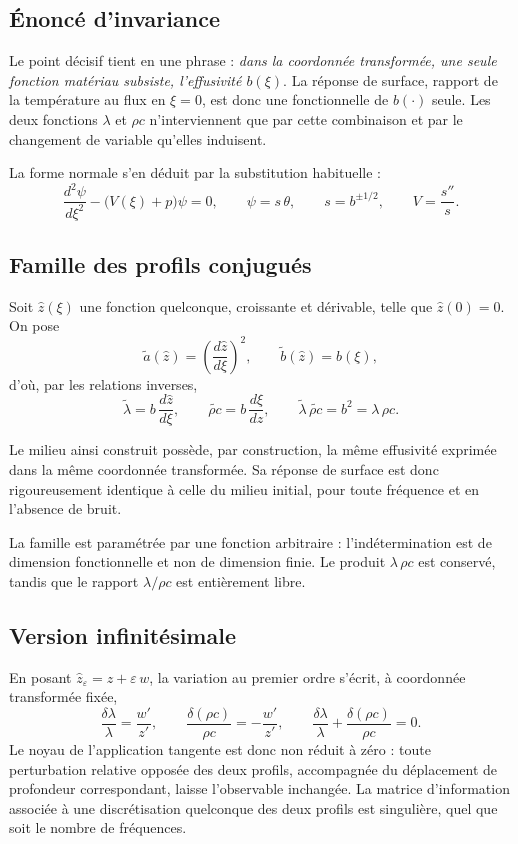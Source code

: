 \documentclass[11pt,a4paper]{article}
\begin{document}
\subsection{Énoncé d'invariance}

Le point décisif tient en une phrase : \emph{dans la coordonnée transformée, une seule fonction
matériau subsiste, l'effusivité $b(\xi)$}. La réponse de surface, rapport de la température au flux en
$\xi=0$, est donc une fonctionnelle de $b(\cdot)$ seule. Les deux fonctions $\lambda$ et $\rho c$
n'interviennent que par cette combinaison et par le changement de variable qu'elles induisent.

La forme normale s'en déduit par la substitution habituelle :
\[ \frac{d^{2}\psi}{d\xi^{2}} - \bigl(V(\xi)+p\bigr)\psi = 0 ,
\qquad \psi = s\,\theta , \qquad s = b^{\pm1/2} , \qquad V = \frac{s''}{s} . \]

\subsection{Famille des profils conjugués}

Soit $\hat z(\xi)$ une fonction quelconque, croissante et dérivable, telle que $\hat z(0)=0$. On pose
\[ \tilde a(\hat z) = \left(\frac{d\hat z}{d\xi}\right)^{\!2} , \qquad
\tilde b(\hat z) = b(\xi) , \]
d'où, par les relations inverses,
\[ \tilde\lambda = b\,\frac{d\hat z}{d\xi} , \qquad
\widetilde{\rho c} = b\,\frac{d\xi}{d\hat z} , \qquad
\tilde\lambda\,\widetilde{\rho c} = b^{2} = \lambda\,\rho c . \]

Le milieu ainsi construit possède, par construction, la même effusivité exprimée dans la même
coordonnée transformée. Sa réponse de surface est donc rigoureusement identique à celle du milieu
initial, pour toute fréquence et en l'absence de bruit.

La famille est paramétrée par une fonction arbitraire : l'indétermination est de dimension
fonctionnelle et non de dimension finie. Le produit $\lambda\,\rho c$ est conservé, tandis que le
rapport $\lambda/\rho c$ est entièrement libre.

\subsection{Version infinitésimale}

En posant $\hat z_{\varepsilon} = z + \varepsilon\,w$, la variation au premier ordre s'écrit, à
coordonnée transformée fixée,
\[ \frac{\delta\lambda}{\lambda} = \frac{w'}{z'} , \qquad
\frac{\delta(\rho c)}{\rho c} = -\frac{w'}{z'} , \qquad
\frac{\delta\lambda}{\lambda} + \frac{\delta(\rho c)}{\rho c} = 0 . \]
Le noyau de l'application tangente est donc non réduit à zéro : toute perturbation relative opposée des
deux profils, accompagnée du déplacement de profondeur correspondant, laisse l'observable inchangée.
La matrice d'information associée à une discrétisation quelconque des deux profils est singulière, quel
que soit le nombre de fréquences.
\end{document}
